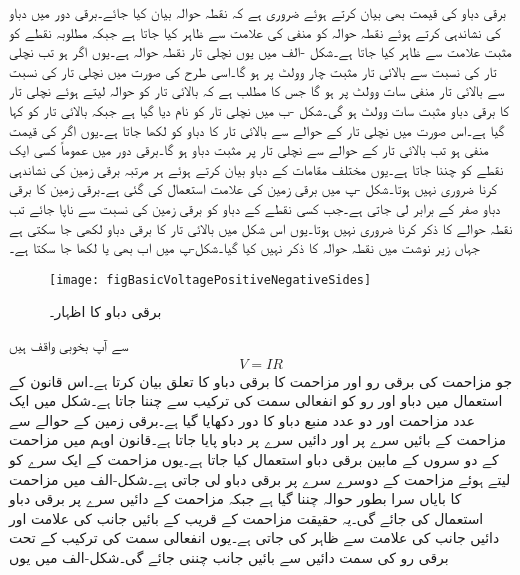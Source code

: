 برقی دباو کی قیمت بھی بیان کرتے ہوئے ضروری ہے کہ نقطہ حوالہ بیان کیا جائے۔برقی دور میں دباو کی نشاندہی کرتے ہوئے نقطہ حوالہ کو منفی کی علامت  سے ظاہر کیا جاتا ہے جبکہ مطلوبہ نقطے کو مثبت علامت  سے ظاہر کیا جاتا ہے۔شکل -الف میں یوں نچلی تار نقطہ حوالہ ہے۔یوں اگر  ہو تب نچلی تار کی نسبت سے بالائی تار مثبت چار وولٹ پر ہو گا۔اسی طرح  کی صورت میں نچلی تار کی نسبت سے بالائی تار منفی سات وولٹ پر ہو گا جس کا مطلب ہے کہ بالائی تار کو حوالہ لیتے ہوئے نچلی تار کا برقی دباو مثبت سات وولٹ ہو گی۔شکل  -ب میں نچلی تار کو  نام دیا گیا ہے جبکہ بالائی تار کو  کہا گیا ہے۔اس صورت میں نچلی تار کے حوالے سے بالائی تار کا دباو کو  لکھا جاتا ہے۔یوں اگر  کی قیمت منفی ہو تب بالائی تار کے حوالے سے نچلی تار پر مثبت دباو ہو گا۔برقی دور میں عموماً کسی ایک نقطے کو  چننا جاتا ہے۔یوں مختلف مقامات کے دباو بیان کرتے ہوئے ہر مرتبہ برقی زمین کی نشاندہی کرنا ضروری نہیں ہوتا۔شکل -پ میں برقی زمین کی علامت استعمال کی گئی ہے۔برقی زمین کا برقی دباو صفر کے برابر لی جاتی ہے۔جب کسی نقطے کے دباو کو برقی زمین کی نسبت سے ناپا جائے تب نقطہ حوالے کا ذکر کرنا ضروری نہیں ہوتا۔یوں اس شکل میں بالائی تار کا برقی دباو  لکھی جا سکتی ہے  جہاں زیر نوشت میں نقطہ حوالہ کا ذکر نہیں کیا گیا۔شکل-پ میں اب بھی  یا  لکھا جا سکتا ہے۔
\begin{figure}
\centering
\texttt{[image: figBasicVoltagePositiveNegativeSides]}
\caption{برقی دباو کا اظہار۔}
\label{شکل_بنیادی_دباو_کا_اظہار}
\end{figure}
%
 سے آپ بخوبی واقف ہیں
\begin{align}
V=I R
\end{align}
جو مزاحمت کی برقی رو اور مزاحمت کا برقی دباو کا تعلق بیان کرتا ہے۔اس قانون کے استعمال میں دباو  اور رو  کو انفعالی سمت کی ترکیب سے چننا جاتا ہے۔شکل  میں ایک عدد مزاحمت اور دو عدد منبع دباو کا دور دکھایا گیا ہے۔برقی زمین کے حوالے سے مزاحمت کے بائیں سرے پر  اور دائیں سرے پر  دباو پایا جاتا ہے۔قانون اوہم میں مزاحمت کے دو سروں کے مابین برقی دباو استعمال کیا جاتا ہے۔یوں مزاحمت کے ایک سرے کو  لیتے ہوئے مزاحمت کے دوسرے سرے پر برقی دباو لی جاتی ہے۔شکل-الف میں مزاحمت کا بایاں سرا بطور حوالہ چننا گیا ہے جبکہ مزاحمت کے دائیں سرے پر برقی دباو استعمال کی جائے گی۔یہ حقیقت مزاحمت کے قریب  کے بائیں جانب  کی علامت اور دائیں جانب   کی علامت سے ظاہر کی جاتی ہے۔یوں انفعالی سمت کی ترکیب کے تحت برقی رو کی سمت دائیں سے بائیں جانب چننی جائے گی۔شکل-الف میں یوں
